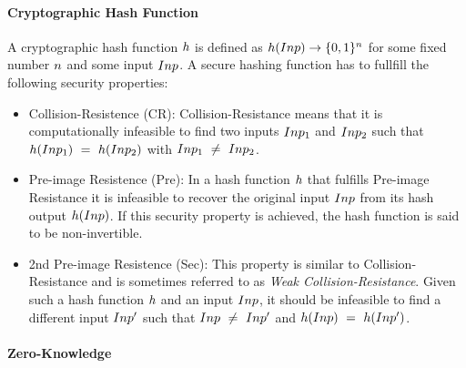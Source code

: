 \paragraph{Cryptographic Hash Function}
A cryptographic hash function $h$ is defined as $h (Inp) \rightarrow \{0,1\}^{n}$ for some fixed number $n$ and some input $Inp$. A secure hashing function
has to fullfill the following security properties:~\cite{al2011cryptographic}
\begin{itemize}
    \item Collision-Resistence (CR): Collision-Resistance means that it is computationally infeasible to find two inputs $Inp_1$ and $Inp_2$ such that
    $h (Inp_1) ~=~ h (Inp_2)$ with $Inp_1 ~\neq~ Inp_2$.
    \item Pre-image Resistence (Pre): In a hash function $h$ that fulfills Pre-image Resistance it is infeasible to recover the original input $Inp$ from its hash output $h (Inp)$.
    If this security property is achieved, the hash function is said to be non-invertible.
    \item 2nd Pre-image Resistence (Sec):  This property is similar to Collision-Resistance and is sometimes referred to as \textit{Weak Collision-Resistance}.
    Given such a hash function $h$ and an input $Inp$, it should be infeasible to find a different input $Inp'$ such that $Inp ~\neq~ Inp'$
    and $h (Inp) ~=~ h (Inp')$.
\end{itemize}


\paragraph{Zero-Knowledge}


